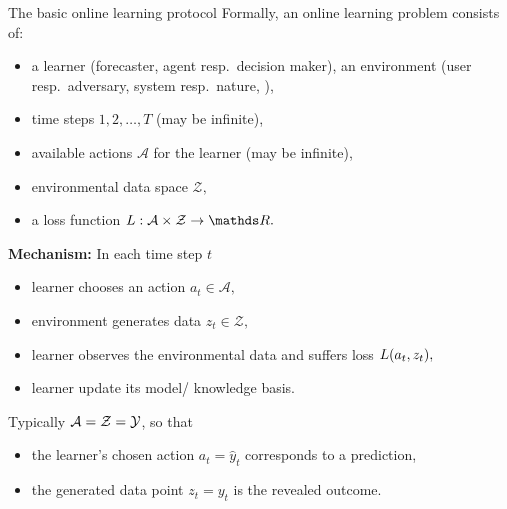 \documentclass[11pt,compress,t,notes=noshow, xcolor=table]{beamer}
\begin{document}
\begin{frame}{The basic online learning protocol}
	\footnotesize
	Formally, an online learning problem consists of:
	\begin{itemize}\footnotesize
		 \item a learner (forecaster, agent resp.\ decision maker), an environment (user resp.\ adversary, system resp.\ nature, ),
		 \item time steps $1,2,\ldots,T$ (may be infinite),
		 \item available actions $\mathcal A$ for the learner (may be infinite),
		 \item environmental data space $\mathcal Z,$
		 \item a loss function $\l: \mathcal{A} \times \mathcal{Z} \to \R.$
	\end{itemize}
	{ {\textbf{Mechanism:} In each time step $t$
	\begin{itemize}\footnotesize
		 \item learner chooses an action $a_{t} \in \mathcal{A},$
		 \item environment generates data $z_{t} \in \mathcal{Z},$
		 \item learner observes the environmental data and suffers loss $L(a_{t},z_{t}),$ 
		 \item learner update its model/ knowledge basis.
	\end{itemize}}}
	{ {	Typically $\mathcal{A} = \mathcal{Z} = \mathcal{Y}$, so that
	\begin{itemize}\footnotesize
		\item the learner's chosen action $a_{t} = \hat{y}_t$ corresponds to a prediction,
		\item the generated data point $z_{t} =y_t$ is the revealed outcome.
	\end{itemize}}}
\end{frame}
\end{document}

